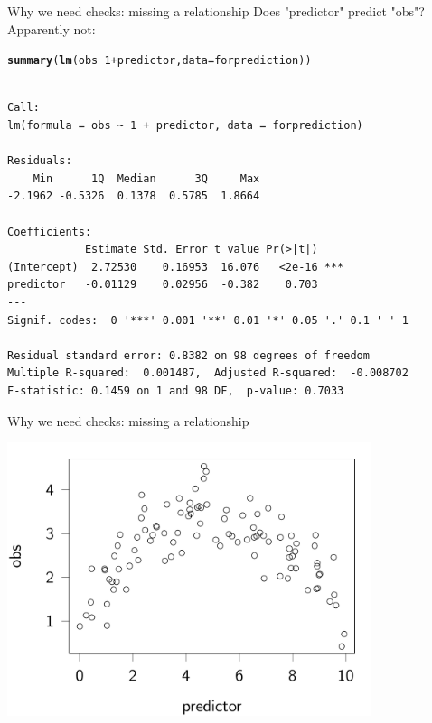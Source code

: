 \documentclass[10pt]{beamer}\usepackage[]{graphicx}\usepackage[]{color}
\makeatletter
\newcommand{\hlnum}[1]{\textcolor[rgb]{0.686,0.059,0.569}{#1}}%
\newcommand{\hlopt}[1]{\textcolor[rgb]{0,0,0}{#1}}%
\newcommand{\hlstd}[1]{\textcolor[rgb]{0.345,0.345,0.345}{#1}}%
\newcommand{\hlkwc}[1]{\textcolor[rgb]{0.333,0.667,0.333}{#1}}%
\newcommand{\hlkwd}[1]{\textcolor[rgb]{0.737,0.353,0.396}{\textbf{#1}}}%
\newenvironment{kframe}{%
 \def\at@end@of@kframe{}%
 \ifinner\ifhmode%
  \def\at@end@of@kframe{\end{minipage}}%
  \begin{minipage}{\columnwidth}%
 \fi\fi%
 \def\FrameCommand##1{\hskip\@totalleftmargin \hskip-\fboxsep
 \colorbox{shadecolor}{##1}\hskip-\fboxsep
     \hskip-\linewidth \hskip-\@totalleftmargin \hskip\columnwidth}%
 \MakeFramed {\advance\hsize-\width
   \@totalleftmargin\z@ \linewidth\hsize
   \@setminipage}}%
 {\par\unskip\endMakeFramed%
 \at@end@of@kframe}
\newenvironment{knitrout}{}{} %
\makeatother
\begin{document}
\begin{frame}[fragile]{Why we need checks: missing a relationship}
  Does "predictor" predict "obs"? Apparently not:
\begin{knitrout}\small
{}\color{fgcolor}\begin{kframe}
\begin{alltt}
  \hlkwd{summary}\hlstd{(}\hlkwd{lm}\hlstd{(obs} \hlopt{~} \hlnum{1} \hlopt{+} \hlstd{predictor,} \hlkwc{data}\hlstd{=forprediction) )}
\end{alltt}
\begin{verbatim}

Call:
lm(formula = obs ~ 1 + predictor, data = forprediction)

Residuals:
    Min      1Q  Median      3Q     Max 
-2.1962 -0.5326  0.1378  0.5785  1.8664 

Coefficients:
            Estimate Std. Error t value Pr(>|t|)    
(Intercept)  2.72530    0.16953  16.076   <2e-16 ***
predictor   -0.01129    0.02956  -0.382    0.703    
---
Signif. codes:  0 '***' 0.001 '**' 0.01 '*' 0.05 '.' 0.1 ' ' 1

Residual standard error: 0.8382 on 98 degrees of freedom
Multiple R-squared:  0.001487,	Adjusted R-squared:  -0.008702 
F-statistic: 0.1459 on 1 and 98 DF,  p-value: 0.7033
\end{verbatim}
\end{kframe}
\end{knitrout}
\end{frame}

\begin{frame}[fragile]{Why we need checks: missing a relationship}

\begin{knitrout}\small
{}\color{fgcolor}
\includegraphics[width=0.8\textwidth,height=0.6\textwidth]{figure/plot0-1} 

\end{knitrout}

\end{frame}
\end{document}
